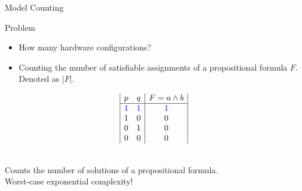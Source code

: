 \documentclass[
	aspectratio=169, %
	8pt, %
]{beamer}
\begin{document}
\begin{frame}{Model Counting}
   
    
    \begin{block}{Problem}
    \begin{itemize}
        \item  {\color{red} How many} hardware configurations?\pause
        \item Counting the number of satisfiable assignments of a propositional formula $F$. Denoted as $|F|$.
    \end{itemize}    
    
    \vspace{0.5cm}
    \begin{displaymath}
        \begin{array}{|c c|c|}
        p & q & F=a \land b\\ %
        \hline %
        \color{blue}1 & \color{blue}1 & \color{blue}1\\
        1 & 0 & 0\\
        0 & 1 & 0\\
        0 & 0 & 0\\
        \end{array}
        \end{displaymath}
    
    \end{block}
    \centering\pause
    \\
    Counts the number of solutions of a propositional formula. \\
    Worst-case exponential complexity!
    \end{frame}
\end{document}
